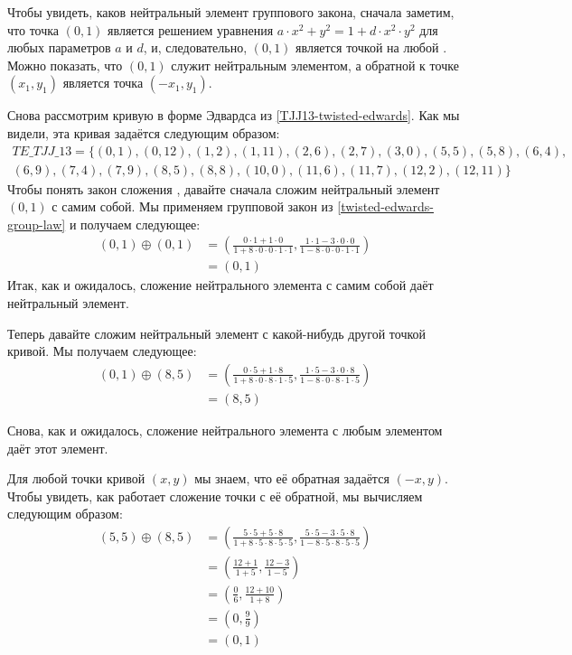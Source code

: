 Чтобы увидеть, каков нейтральный элемент группового закона, сначала заметим, что точка $(0,1)$ является решением уравнения  $a\cdot x^{2} + y^2 =1+ d\cdot x^{2}\cdot y^2$ для любых параметров $a$ и $d$, и, следовательно, $(0,1)$ является точкой на любой . Можно показать, что $(0,1)$ служит нейтральным элементом, а обратной к точке $(x_1, y_1)$ является точка $(-x_1, y_1)$.
\begin{example}
\label{example:TETJJ13}
 Снова рассмотрим кривую  в форме Эдвардса из \eqref{TJJ13-twisted-edwards}. Как мы видели, эта кривая задаётся следующим образом:
\begin{multline}
\mathit{TE\_TJJ\_13} = \{(0, 1),(0, 12),(1, 2),(1, 11),(2, 6),(2, 7),(3, 0),(5, 5),(5, 8),(6, 4),\\
(6, 9),(7, 4),(7, 9),(8, 5),(8, 8),(10, 0),(11, 6),(11, 7),(12, 2),(12, 11)\}
\end{multline}
Чтобы понять закон сложения , давайте сначала сложим нейтральный элемент $(0,1)$ с самим собой. Мы применяем групповой закон из \eqref{twisted-edwards-group-law} и получаем следующее:
\begin{align*}
(0, 1) \oplus (0, 1) &= \left(\frac{0\cdot 1+1 \cdot 0}{1 +8\cdot0\cdot 0\cdot 1\cdot 1},\frac{1\cdot 1-3\cdot 0\cdot 0}{1-8\cdot 0\cdot 0\cdot 1\cdot 1}\right)\\
                     & = (0,1)
\end{align*}
Итак, как и ожидалось, сложение нейтрального элемента с самим собой даёт нейтральный элемент. 

Теперь давайте сложим нейтральный элемент с какой-нибудь другой точкой кривой. Мы получаем следующее:
\begin{align*}
(0, 1) \oplus (8, 5) &= \left(\frac{0\cdot 5+1 \cdot 8}{1 +8\cdot0\cdot 8\cdot 1\cdot 5},\frac{1\cdot 5 - 3\cdot 0\cdot 8}{1-8\cdot 0\cdot 8\cdot 1\cdot 5}\right)\\
                     & = (8,5)
\end{align*}

Снова, как и ожидалось, сложение нейтрального элемента с любым элементом даёт этот элемент. 

Для любой точки кривой $(x,y)$ мы знаем, что её обратная задаётся $(-x,y)$. Чтобы увидеть, как работает сложение точки с её обратной, мы вычисляем следующим образом:
\begin{align*}
(5, 5) \oplus (8, 5) &= \left(\frac{5\cdot 5+5 \cdot 8}{1 +8\cdot 5\cdot 8\cdot 5\cdot 5},\frac{5\cdot 5 - 3\cdot 5\cdot 8}{1-8\cdot 5\cdot 8\cdot 5\cdot 5}\right)\\
                     &= \left(\frac{12+1}{1 +5},\frac{12 - 3}{1-5}\right)\\
                     &= \left(\frac{0}{6},\frac{12 + 10}{1+8}\right)\\
                     &= \left(0,\frac{9}{9}\right)\\
                     &=  (0,1)
\end{align*}


\end{example}
